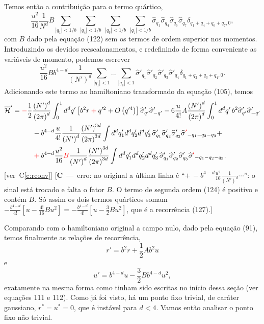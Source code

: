 \documentclass[12pt,a4paper]{article}
\newcommand{\Hb}{\overline{\mathcal{H}}}
\newcommand{\sh}{\widehat{\sigma}}
\newcommand{\corr}[1]{\textcolor{red}{#1}}
\newcommand{\cmais}{\mathbin{\textcolor{red}{+}}}
\newcounter{corr}
\newcommand{\nota}[2]{\refstepcounter{corr}\label{#1}%
  {\color{red}\small[\textbf{C\thecorr}~---~#2]}}
\newcommand{\ver}[1]{{\color{red}\small[ver~C\ref{#1}]}}
\begin{document}
Temos então a contribuição para o termo quártico,
\begin{equation}
\frac{u^2}{16}\frac{1}{N^d}B\sum_{|q_1|<1/b}\ \sum_{|q_4|<1/b}\ \sum_{|q_6|<1/b}\ \sum_{|q_7|<1/b}\sh_{q_1}\sh_{q_4}\sh_{q_6}\sh_{q_7}\delta_{q_1+q_4+q_6+q_7,0},
\end{equation}
com $B$ dado pela equação (122) sem os termos de ordem superior nos
momentos. Introduzindo os devidos reescalonamentos, e redefinindo de forma
conveniente as variáveis de momento, podemos escrever
\begin{equation}
\frac{u^2}{16}Bb^{4-d}\frac{1}{\left(N'\right)^d}\sum_{|q_1|<1}...\sum_{|q_4|<1}\sh'_{q_1}\sh'_{q_2}\sh'_{q_3}\sh'_{q_4}\delta_{q_1+q_2+q_3+q_4,0}.
\end{equation}
Adicionando este termo ao hamiltoniano transformado da equação (105),
temos
\begin{equation}
\begin{split}
\Hb'=\corr{-}\frac12&\frac{\left(N'\right)^d}{\left(2\pi\right)^d}\int_0^1d^dq'\left[b^2r\cmais q'^2+O\left(q'^4\right)\right]\sh'_{q'}\sh'_{-q'}
-6\frac{u}{4!}A\frac{\left(N'\right)^d}{\left(2\pi\right)^d}\int_0^1d^dq'\,b^2\sh'_{q'}\sh'_{-q'}\\
&-b^{4-d}\frac{u}{4!}\frac{1}{\left(N'\right)^d}\frac{\left(N'\right)^{3d}}{\left(2\pi\right)^{3d}}\int d^dq'_1d^dq'_2d^dq'_3\,\sh'_{q_1}\sh'_{q_2}\sh'_{q_3}\sh\corr{'}_{-q_1-q_2-q_3}+\\
&\cmais b^{4-d}\frac{u^2}{16}\corr{B}\frac{1}{\left(N'\right)^d}\frac{\left(N'\right)^{3d}}{\left(2\pi\right)^{3d}}\int d^dq'_1d^dq'_2d^dq'_3\,\sh'_{q_1}\sh'_{q_2}\sh'_{q_3}\sh\corr{'}_{-q_1-q_2-q_3}.
\end{split}
\end{equation}
\ver{c:rconv}
\nota{c:e125}{erro: no original a última linha é
``$+\,-b^{4-d}\frac{u^2}{16}\frac{1}{(N')^d}\cdots$'': o sinal está trocado e falta o fator $B$.
O termo de segunda ordem (124) é positivo e contém $B$. Só assim os dois termos quárticos somam
$-\frac{b^{4-d}}{4!}\left[u-\frac{4!}{16}Bu^2\right]=-\frac{b^{4-d}}{4!}\left[u-\frac32Bu^2\right]$,
que é a recorrência (127).}

Comparando com o hamiltoniano original a campo nulo, dado pela equação
(91), temos finalmente as relações de recorrência,
\begin{equation}
r'=b^2r+\frac12Ab^2u
\end{equation}
e
\begin{equation}
u'=b^{4-d}u-\frac32Bb^{4-d}u^2,
\end{equation}
exatamente na mesma forma como tinham sido escritas no início dessa seção
(ver equações 111 e 112). Como já foi visto, há um ponto fixo trivial, de
caráter gaussiano, $r^*=u^*=0$, que é instável para $d<4$. Vamos então
analisar o ponto fixo não trivial.
\end{document}
